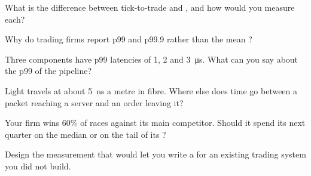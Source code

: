 \begin{interviewq}\label{iq:ll:where-latency-comes-from:1}
What is the difference between tick-to-trade and , and how would you measure each?
\end{interviewq}

\begin{interviewq}\label{iq:ll:where-latency-comes-from:2}
Why do trading firms report p99 and p99.9 rather than the mean ?
\end{interviewq}

\begin{interviewq}\label{iq:ll:where-latency-comes-from:3}
Three components have p99 latencies of 1, 2 and \qty{3}{\micro\second}. What can you say about the p99 of the
pipeline?
\end{interviewq}

\begin{interviewq}\label{iq:ll:where-latency-comes-from:4}
Light travels at about \qty{5}{\nano\second} a metre in fibre. Where else does time go between a packet reaching a
server and an order leaving it?
\end{interviewq}

\begin{interviewq}\label{iq:ll:where-latency-comes-from:5}
Your firm wins 60\% of races against its main competitor. Should it spend its next quarter on the median or on the
tail of its ?
\end{interviewq}

\begin{interviewq}\label{iq:ll:where-latency-comes-from:6}
Design the measurement that would let you write a  for an existing trading system you did not build.
\end{interviewq}
